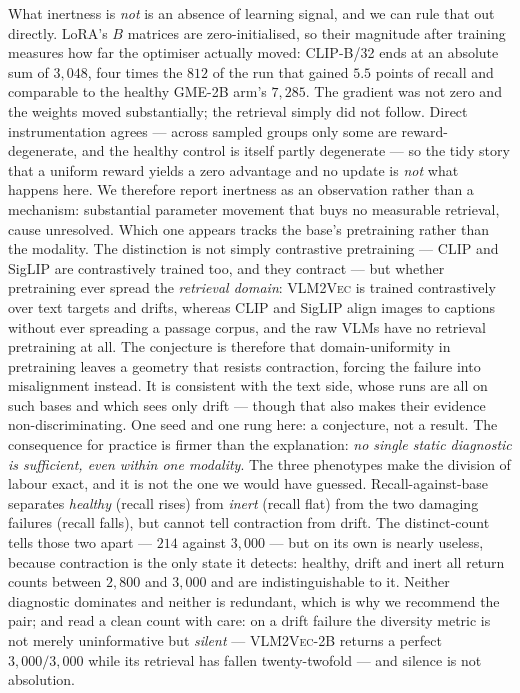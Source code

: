 What inertness is \emph{not} is an absence of learning signal, and we can rule that out
directly. LoRA's $B$ matrices are zero-initialised, so their magnitude after training measures how
far the optimiser actually moved: \textsc{CLIP-B/32} ends at an absolute sum of $3{,}048$, four
times the $812$ of the run that gained $5.5$ points of recall and comparable to the healthy
\textsc{GME-2B} arm's $7{,}285$. The gradient was not zero and the weights moved substantially;
the retrieval simply did not follow. Direct instrumentation agrees --- across sampled groups only
some are reward-degenerate, and the healthy control is itself partly degenerate --- so the tidy
story that a uniform reward yields a zero advantage and no update is \emph{not} what happens here.
We therefore report inertness as an observation rather than a mechanism: substantial parameter
movement that buys no measurable retrieval, cause unresolved. Which one
appears tracks the base's pretraining rather than the modality. The distinction is not simply
contrastive pretraining --- CLIP and SigLIP are contrastively trained too, and they contract ---
but whether pretraining ever spread the \emph{retrieval domain}: \textsc{VLM2Vec} is trained
contrastively over text targets and drifts, whereas CLIP and SigLIP align images to captions
without ever spreading a passage corpus, and the raw VLMs have no retrieval pretraining at all.
The conjecture is therefore that domain-uniformity in pretraining leaves a geometry that resists
contraction, forcing the failure into misalignment instead. It is consistent with the text side,
whose runs are all on such bases and which sees only drift --- though that also makes their
evidence non-discriminating. One seed and one rung here: a conjecture, not a result. The consequence for practice is firmer
than the explanation: \emph{no single static diagnostic is sufficient, even within one
modality}. The three phenotypes make the division of labour exact, and it is not the
one we would have guessed. Recall-against-base separates \emph{healthy} (recall rises) from
\emph{inert} (recall flat) from the two damaging failures (recall falls), but cannot tell
contraction from drift. The distinct-count tells those two apart --- $214$ against $3{,}000$ ---
but on its own is nearly useless, because contraction is the only state it detects: healthy,
drift and inert all return counts between $2{,}800$ and $3{,}000$ and are indistinguishable to
it. Neither diagnostic dominates and neither is redundant, which is why we recommend the pair;
and read a clean count with care: on a drift failure the diversity metric is not merely uninformative but
\emph{silent} --- \textsc{VLM2Vec-2B} returns a perfect $3{,}000/3{,}000$ while its retrieval has
fallen twenty-twofold --- and silence is not absolution.

